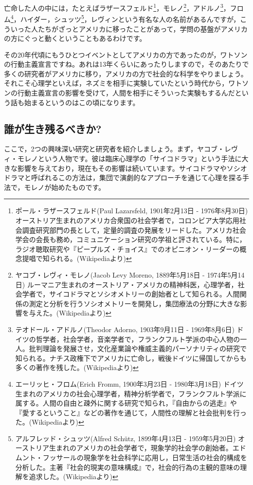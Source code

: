 \documentclass{ltjsbook}
\begin{document}
亡命した人の中には，たとえばラザースフェルド\footnote{ポール・ラザースフェルド(Paul Lazarsfeld, 1901年2月13日 - 1976年8月30日)  オーストリア生まれのアメリカ合衆国の社会学者で，コロンビア大学応用社会調査研究部門の長として，定量的調査の発展をリードした。アメリカ社会学会の会長も務め，コミュニケーション研究の学祖と評されている。特に，ラジオ聴取研究や『ピープルズ・チョイス』でのオピニオン・リーダーの概念提唱で知られる。(Wikipediaより)}，モレノ\footnote{ヤコブ・レヴィ・モレノ(Jacob Levy Moreno, 1889年5月18日 - 1974年5月14日)  ルーマニア生まれのオーストリア・アメリカの精神科医，心理学者，社会学者で，サイコドラマとソシオメトリーの創始者として知られる。人間関係の測定と分析を行うソシオメトリーを開発し，集団療法の分野に大きな影響を与えた。(Wikipediaより)}，アドルノ\footnote{テオドール・アドルノ(Theodor Adorno, 1903年9月11日 - 1969年8月6日)  ドイツの哲学者，社会学者，音楽学者で，フランクフルト学派の中心人物の一人。批判理論を発展させ，文化産業論や権威主義的パーソナリティの研究で知られる。ナチス政権下でアメリカに亡命し，戦後ドイツに帰国してからも多くの著作を残した。(Wikipediaより)}，フロム\footnote{エーリッヒ・フロム(Erich Fromm, 1900年3月23日 - 1980年3月18日)  ドイツ生まれのアメリカの社会心理学者，精神分析学者で，フランクフルト学派に属する。人間の自由と疎外に関する研究で知られ，『自由からの逃走』や『愛するということ』などの著作を通じて，人間性の理解と社会批判を行った。(Wikipediaより)}，ハイダー，シュッツ\footnote{アルフレッド・シュッツ(Alfred Schütz, 1899年4月13日 - 1959年5月20日)  オーストリア生まれのアメリカの社会学者で，現象学的社会学の創始者。エドムント・フッサールの現象学を社会科学に応用し，日常生活の社会的構成を分析した。主著『社会的現実の意味構成』で，社会的行為の主観的意味の理解を追求した。(Wikipediaより)}，レヴィンという有名な人の名前があるんですが，こういった人たちがざっとアメリカに移ったことがあって，学問の基盤がアメリカの方にぐっと動くということもあるわけです。

その20年代頃にもうひとつイベントとしてアメリカの方であったのが，ワトソンの行動主義宣言ですね。あれは13年くらいにあったりしますので，そのあたりで多くの研究者がアメリカに移り，アメリカの方で社会的な科学をやりましょう。それこそ心理学といえば，ネズミを相手に実験していたという時代から，ワトソンの行動主義宣言の影響を受けて，人間を相手にそういった実験もするんだという話も始まるというのはこの頃になります。

\subsection{誰が生き残るべきか?}
ここで，2つの興味深い研究と研究者を紹介しましょう。まず，ヤコブ・レヴィ・モレノという人物です。彼は臨床心理学の「サイコドラマ」という手法に大きな影響を与えており，現在もその影響は続いています。サイコドラマやソシオドラマと呼ばれるこの方法は，集団で演劇的なアプローチを通じて心理を探る手法で，モレノが始めたものです。
\end{document}
